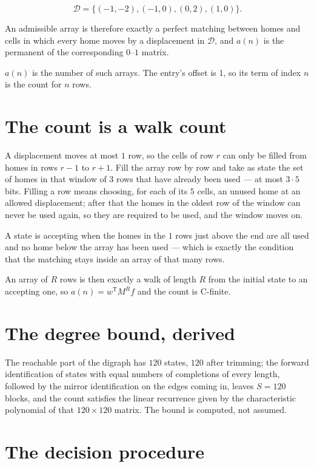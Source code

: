 \documentclass[11pt]{article}
\theoremstyle{definition}
\begin{document}
\[\mathcal{D} = \{(-1,-2), (-1,0), (0,2), (1,0)\}.\]

An admissible array is therefore exactly a perfect matching between homes and cells in which every home moves by a displacement in $\mathcal{D}$, and $a(n)$ is the permanent of the corresponding $0$--$1$ matrix.

$a(n)$ is the number of such arrays. The entry's offset is 1, so its term of index $n$ is the count for $n$ rows.

\section{The count is a walk count}

A displacement moves at most $1$ row, so the cells of row $r$ can only be filled from homes in rows $r-1$ to $r+1$. Fill the array row by row and take as state the set of homes in that window of $3$ rows that have already been used --- at most $3\cdot5$ bits. Filling a row means choosing, for each of its $5$ cells, an unused home at an allowed displacement; after that the homes in the oldest row of the window can never be used again, so they are required to be used, and the window moves on.

A state is accepting when the homes in the $1$ rows just above the end are all used and no home below the array has been used --- which is exactly the condition that the matching stays inside an array of that many rows.

An array of $R$ rows is then exactly a walk of length $R$ from the initial state to an accepting one, so $a(n) = w^{\mathsf T}M^{R}f$ and the count is C-finite.

\section{The degree bound, derived}

The reachable part of the digraph has $120$ states, $120$ after trimming; the forward identification of states with equal numbers of completions of every length, followed by the mirror identification on the edges coming in, leaves $S = 120$ blocks, and the count satisfies the linear recurrence given by the characteristic polynomial of that $120\times120$ matrix. The bound is computed, not assumed.

\section{The decision procedure}
\end{document}
